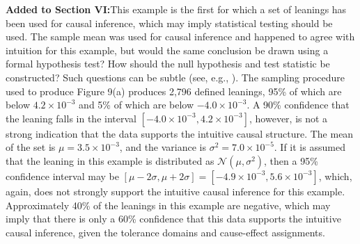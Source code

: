 \documentclass[a4paper,11pt]{article}
\begin{document}
{\bf Added to Section VI:}This example is the first for which a set of leanings has been used for causal inference, which may imply statistical testing should be used.  The sample mean was used for causal inference and happened to agree with intuition for this example, but would the same conclusion be drawn using a formal hypothesis test?  How should the null hypothesis and test statistic be constructed?  Such questions can be subtle (see, e.g., \cite{Rubin2015}).  The sampling procedure used to produce Figure 9(a) produces 2,796 defined leanings, 95\% of which are below $4.2\times 10^{-3}$ and 5\% of which are below $-4.0\times 10^{-3}$.  A 90\% confidence that the leaning falls in the interval $[-4.0\times 10^{-3},4.2\times10^{-3}]$, however, is not a strong indication that the data supports the intuitive causal structure.  The mean of the set is $\mu = 3.5\times 10^{-3}$, and the variance is $\sigma^2 = 7.0\times 10^{-5}$.  If it is assumed that the leaning in this example is distributed as $\mathcal{N}(\mu,\sigma^2)$, then a 95\% confidence interval may be $[\mu-2\sigma,\mu+2\sigma]=[-4.9\times 10^{-3},5.6\times 10^{-3}]$, which, again, does not strongly support the intuitive causal inference for this example.  Approximately 40\% of the leanings in this example are negative, which may imply that there is only a 60\% confidence that this data supports the intuitive causal inference, given the tolerance domains and cause-effect assignments.  
\end{document}

